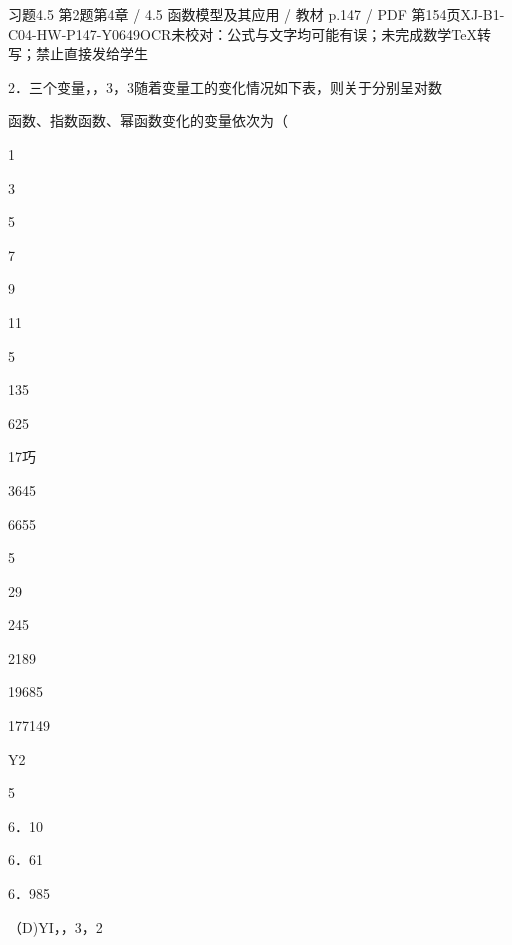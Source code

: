 \begin{bankitem}{习题4.5 第2题}{第4章 / 4.5 函数模型及其应用 / 教材 p.147 / PDF 第154页}{XJ-B1-C04-HW-P147-Y0649}{OCR未校对：公式与文字均可能有误；未完成数学TeX转写；禁止直接发给学生}
\begin{ocrdraft}
\par
2．三个变量，，3，3随着变量工的变化情况如下表，则关于分别呈对数
\par
函数、指数函数、幂函数变化的变量依次为（
\par
1
\par
3
\par
5
\par
7
\par
9
\par
11
\par
5
\par
135
\par
625
\par
17巧
\par
3645
\par
6655
\par
5
\par
29
\par
245
\par
2189
\par
19685
\par
177149
\par
Y2
\par
5
\par
6．10
\par
6．61
\par
6．985
\par
（D)YI，，3，2
\end{ocrdraft}
\end{bankitem}
